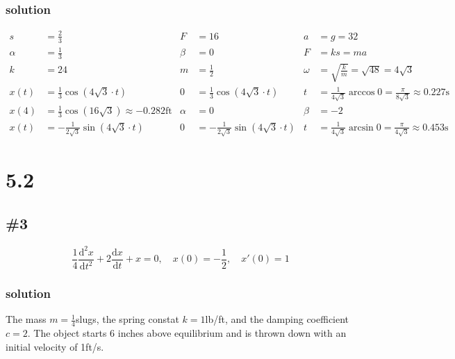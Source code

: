 \documentclass{article}
\begin{document}
\subsubsection*{solution}
\begin{align*}
	s&=\frac{2}{3} & F&=16 & a&=g=32\\
	\alpha&=\frac{1}{3} & \beta&=0 &	F&=ks=ma\\
	k&=24 & m&=\frac{1}{2} & \omega&=\sqrt{\frac{k}{m}}=\sqrt{48}=4\sqrt{3}\\
	x(t)&=\frac{1}{3}\cos(4\sqrt{3}\cdot t) & 0&=\frac{1}{3}\cos(4\sqrt{3}\cdot t) & t&=\frac{1}{4\sqrt{3}}\arccos 0=\frac{\pi}{8\sqrt{3}}\approx0.227\text{s}\\
	x(4)&=\frac{1}{3}\cos(16\sqrt{3})\approx -0.282\text{ft} & \alpha&=0 & \beta&=-2\\
	x(t)&=-\frac{1}{2\sqrt{3}}\sin(4\sqrt{3}\cdot t) & 0&=-\frac{1}{2\sqrt{3}}\sin(4\sqrt{3}\cdot t) & t&=\frac{1}{4\sqrt{3}}\arcsin 0=\frac{\pi}{4\sqrt{3}}\approx0.453\text{s}
\end{align*}
\section*{5.2}

\subsection*{\#3}
\[\frac{1}{4}\frac{\mathrm{d}^2x}{\mathrm{d}t^2}+2\frac{\mathrm{d}x}{\mathrm{d}t}+x=0,\quad x(0)=-\frac{1}{2},\quad x'(0)=1\]
\subsubsection*{solution}
The mass $m=\frac{1}{4}$slugs, the spring constat $k=1$lb/ft, and the damping coefficient $c=2$. The object starts 6 inches above equilibrium and is thrown down with an initial velocity of 1ft/s.
\end{document}
